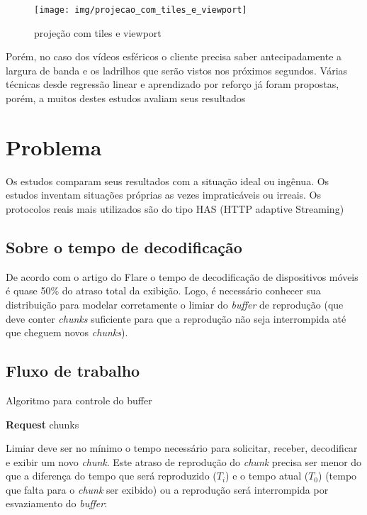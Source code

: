 \begin{figure}[tbh]
	\centering
	\texttt{[image: img/projecao\_com\_tiles\_e\_viewport]}
	\caption{projeção com tiles e viewport}
	\label{fig:projecaocomtileseviewport}
\end{figure}

Porém, no caso dos vídeos esféricos o cliente precisa saber antecipadamente a largura de banda e os ladrilhos que serão vistos nos próximos segundos. Várias técnicas desde regressão linear e aprendizado por reforço já foram propostas, porém, a muitos destes estudos avaliam seus resultados

\section{Problema}

Os estudos comparam seus resultados com a situação ideal ou ingênua. Os estudos inventam situações próprias as vezes impraticáveis ou irreais. Os protocolos reais mais utilizados são do tipo HAS (HTTP adaptive Streaming)

\subsection{Sobre o tempo de decodificação}

De acordo com o artigo do Flare o tempo de decodificação de dispositivos móveis é quase 50\% do atraso total da exibição. Logo, é necessário conhecer sua distribuição para modelar corretamente o limiar do \textit{buffer} de reprodução (que deve conter \textit{chunks} suficiente para que a reprodução não seja interrompida até que cheguem novos \textit{chunks}).

\subsection{Fluxo de trabalho}

\begin{algorithm}
	\caption{Algoritmo para controle do buffer}\label{alg:buffer_control}
	\begin{algorithmic}[1]
		
				\State \textbf{Request} chunks
			\EndWhile
		\EndIf
	\EndWhile
	\end{algorithmic}
\end{algorithm}

Limiar deve ser no mínimo o tempo necessário para solicitar, receber, decodificar e exibir um novo \textit{chunk}. Este atraso de reprodução do \textit{chunk} precisa ser menor do que a diferença do tempo que será reproduzido ($T_i$) e o tempo atual ($T_0$) (tempo que falta para o \textit{chunk} ser exibido) ou a reprodução será interrompida por esvaziamento do \textit{buffer}:

